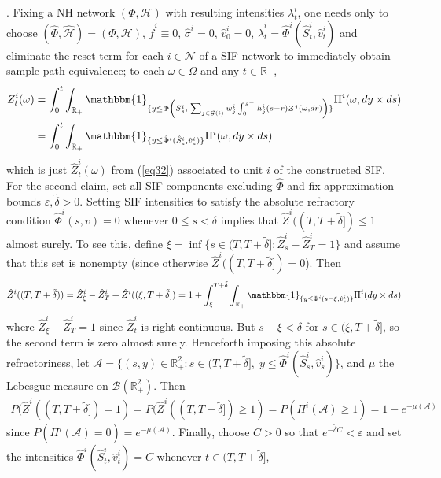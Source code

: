 \documentclass[12pt, oneside]{report}
\newcommand{\mbb}[1]{\mathbb{#1}}
\newcommand{\1}[1]{\mathbbm{1}_{\{#1\}}}
\newcommand{\mc}[1]{\mathcal{#1}}
\theoremstyle{definition}
\begin{document}
. Fixing a NH network $(\Phi,\mc{H})$ with resulting
intensities $\lambda^i_t$, one needs only to choose
$(\hat{\Phi},\hat{\mc{H}})=(\Phi,\mc{H})$, $\hat{f}^i\equiv 0$,
$\hat{\sigma}^i=0$, $\hat{v}^i_0=0$,
$\hat{\lambda}^i_t=\hat{\Phi}^i(\hat{S}^i_t,\hat{v}^i_t)$ and eliminate the
reset term for each $i\in\mc{N}$ of a SIF network to immediately obtain sample
path equivalence; to each $\omega\in\Omega$ and any $t\in\mbb{R}_+$,
\begin{align*}
    Z^i_t(\omega)&=\int_0^t\int_{\mbb{R}_+}\1{y\leq \Phi\left(S^i_s,\;\sum_{j\in\mc{G}(i)}w^i_j\int_0^{s^-}h^i_j(s-r)Z^j(\omega, dr)\right)}\Pi^i(\omega,dy\times ds)\\
    &=\int_0^t\int_{\mbb{R}_+}\1{y\leq \hat{\Phi}^i(\hat{S}^i_s,\hat{v}^i_s)}\Pi^i(\omega,dy\times ds)
\end{align*}
which is just $\hat{Z}^i_t(\omega)$ from (\ref{eq32}) associated to unit $i$ of
the constructed SIF.\\[5pt]
\noindent For the second claim, set all SIF components excluding $\hat{\Phi}$
and fix approximation bounds $\varepsilon,\tilde{\delta}>0$. Setting SIF
intensities to satisfy the absolute refractory condition $\hat{\Phi}^i(s,v)=0$
whenever $0\leq s<\delta$ implies that $\hat{Z}^i((T,T+\tilde{\delta}])\leq 1$
almost surely. To see this, define
$\xi=\inf\{s\in(T,T+\tilde{\delta}]:\hat{Z}^i_s-\hat{Z}^i_T=1\}$ and assume that
this set is nonempty (since otherwise $\hat{Z}^i((T,T+\tilde{\delta}])=0$). Then 
\begin{align*}
    \hat{Z}^i((T,T+\tilde{\delta}))=\hat{Z}^i_\xi-\hat{Z}^i_T+\hat{Z}^i((\xi,T+\tilde{\delta}])=1+\int_\xi^{T+\tilde{\delta}}\int_{\mbb{R}_+}\1{y\leq \hat{\Phi}^i(s-\xi,\hat{v}^i_s)}\Pi^i(dy\times ds)
\end{align*}
where  $\hat{Z}^i_{\xi}-\hat{Z}^i_T=1$ since $\hat{Z}^i_t$ is right continuous.
But $s-\xi<\delta$ for $s\in(\xi,T+\tilde{\delta}]$, so the second term is zero
almost surely. Henceforth imposing this absolute refractoriness, let
$\mc{A}=\{(s,y)\in\mbb{R}_+^2:s\in(T,T+\tilde{\delta}],\;y\leq\hat{\Phi}^i(\hat{S}^i_s,\hat{v}^i_s)\}$,
and $\mu$ the Lebesgue measure on $\mc{B}(\mbb{R}_+^2)$. Then
\begin{align*}
    P(\hat{Z}^i((T,T+\tilde{\delta}])=1)=P(\hat{Z}^i((T,T+\tilde{\delta}])\geq 1)=P(\Pi^i(\mc{A})\geq 1)=1-e^{-\mu(\mc{A})}
\end{align*}
since $P(\Pi^i(\mc{A})=0)=e^{-\mu(\mc{A})}$. Finally, choose $C>0$ so that
$e^{-\tilde{\delta}C}<\varepsilon$ and set the intensities
$\hat{\Phi}^i(\hat{S}^i_t,\hat{v}^i_t)=C$ whenever $t\in(T,T+\tilde{\delta}]$,
\end{document}
